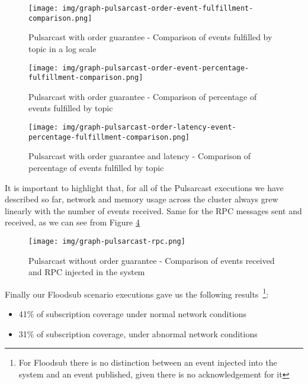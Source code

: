 \begin{figure}[!htb]
  \centering
  \texttt{[image: img/graph-pulsarcast-order-event-fulfillment-comparison.png]}
  \caption{Pulsarcast with order guarantee - Comparison of events fulfilled by topic in a log scale}
  \label{fig:graph-pulsarcast-order-event-fulfillment-comparison}
\end{figure}

\begin{figure}[!htb]
  \centering
  \texttt{[image: img/graph-pulsarcast-order-event-percentage-fulfillment-comparison.png]}
  \caption{Pulsarcast with order guarantee - Comparison of percentage of events fulfilled by topic}
  \label{fig:graph-pulsarcast-order-event-percentage-fulfillment-comparison}
\end{figure}

\begin{figure}[!htb]
  \centering
  \texttt{[image: img/graph-pulsarcast-order-latency-event-percentage-fulfillment-comparison.png]}
  \caption{Pulsarcast with order guarantee and latency - Comparison of percentage of events fulfilled by topic}
  \label{fig:graph-pulsarcast-order-latency-event-percentage-fulfillment-comparison}
\end{figure}

It is important to highlight that, for all of the Pulsarcast executions we have
described so far, network and memory usage across the cluster always grew
linearly with the number of events received. Same for the RPC messages sent and
received, as we can see from Figure \ref{fig:graph-pulsarcast-rpc}

\begin{figure}[!htb]
  \centering
  \texttt{[image: img/graph-pulsarcast-rpc.png]}
  \caption{Pulsarcast without order guarantee - Comparison of events received and RPC injected in the system}
  \label{fig:graph-pulsarcast-rpc}
\end{figure}

Finally our Floodsub scenario executions gave us the following
results~\footnote{For Floodsub there is no distinction between an event
injected into the system and an event published, given there is no
acknowledgement for it}:

\begin{itemize}
  \item 41\% of subscription coverage under normal network conditions
  \item 31\% of subscription coverage, under abnormal network conditions
\end{itemize}

